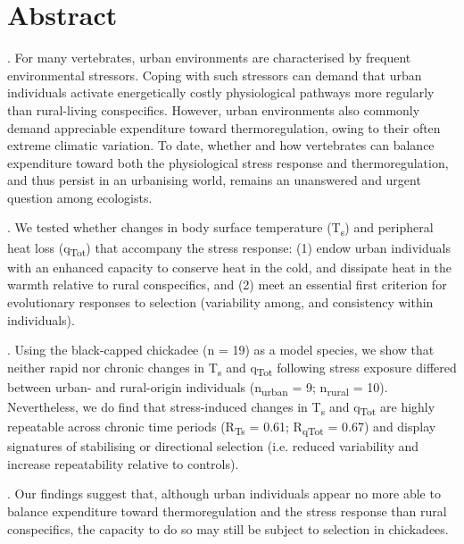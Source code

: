 \documentclass[12pt]{article}
\begin{document}
\linenumbers
\fontsize{12pt}{12pt}\selectfont

\section*{Abstract}

. For many vertebrates, urban environments are characterised by frequent environmental stressors. Coping with such stressors can demand that urban individuals activate energetically costly physiological pathways more regularly than rural-living conspecifics. However, urban environments also commonly demand appreciable expenditure toward thermoregulation, owing to their often extreme climatic variation. To date, whether and how vertebrates can balance expenditure toward both the physiological stress response and thermoregulation, and thus persist in an urbanising world, remains an unanswered and urgent question among ecologists. 
\vspace{\baselineskip}

. We tested whether changes in body surface temperature (T\textsubscript{s}) and peripheral heat loss (q\textsubscript{Tot}) that accompany the stress response: (1) endow urban individuals with an enhanced capacity to conserve heat in the cold, and dissipate heat in the warmth relative to rural conspecifics, and (2) meet an essential first criterion for evolutionary responses to selection (variability among, and consistency within individuals). 
\vspace{\baselineskip}

. Using the black-capped chickadee (n = 19) as a model species, we show that neither rapid nor chronic changes in T\textsubscript{s} and q\textsubscript{Tot} following stress exposure differed between urban- and rural-origin individuals (n\textsubscript{urban} = 9; n\textsubscript{rural} = 10). Nevertheless, we do find that stress-induced changes in T\textsubscript{s} and q\textsubscript{Tot} are highly repeatable across chronic time periods (R\textsubscript{Ts} = 0.61; R\textsubscript{qTot} = 0.67) and display signatures of stabilising or directional selection (i.e. reduced variability and increase repeatability relative to controls). 
\vspace{\baselineskip}

. Our findings suggest that, although urban individuals appear no more able to balance expenditure toward thermoregulation and the stress response than rural conspecifics, the capacity to do so may still be subject to selection in chickadees.
\vspace{\baselineskip}
\vspace{\baselineskip}
\end{document}
